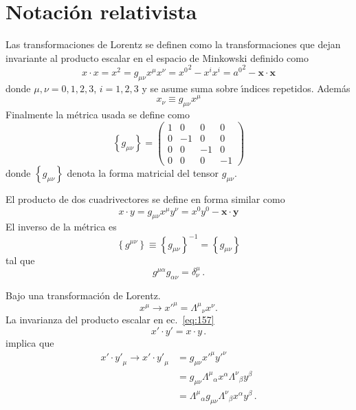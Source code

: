 \section{Notaci\'on relativista}
\label{sec:srn}
\begin{frame}
Las transformaciones de Lorentz se definen como la transformaciones que dejan invariante al producto escalar en el espacio de Minkowski definido como
\begin{equation}
  \label{eq:146}
 x\cdot x= x^2=g_{\mu\nu}x^\mu x^\nu={x^0}^2-x^i x^i={a^0}^2-\mathbf{x}\cdot\mathbf{x}
\end{equation}
donde $\mu,\nu=0,1,2,3$, $i=1,2,3$ y se asume suma sobre \'\i ndices repetidos. Adem\'as
\begin{equation}
\label{eq:149}
  x_\nu\equiv g_{\mu\nu}x^\mu
\end{equation}
 Finalmente la m\'etrica usada se define como
\begin{equation}
  \label{eq:gmunu}
  \left\{ g_{\mu\nu} \right\}=
  \begin{pmatrix}
    1&0&0&0\\
    0&-1&0&0\\
    0&0&-1&0\\
    0&0&0&-1
  \end{pmatrix}
\end{equation}
donde $\left\{ g_{\mu\nu} \right\}$ denota la forma matricial del tensor $g_{\mu\nu}$.  



El producto de dos cuadrivectores se define en forma similar como
\begin{equation}
\label{eq:157}
  x\cdot y=g_{\mu\nu}x^\mu y^\nu=x^0y^0-\mathbf{x}\cdot\mathbf{y}
\end{equation}
El inverso de la métrica es
\begin{equation}
  \left\{ g^{\mu\nu} \right\}\equiv\left\{ g_{\mu\nu} \right\}^{-1}=\left\{ g_{\mu\nu} \right\}
\end{equation}
tal que
\begin{equation}
  g^{\mu\alpha}g_{\alpha\nu}=\delta^\mu_\nu\,.
\end{equation}

Bajo una transformaci\'on de Lorentz.
\begin{equation}
  \label{eq:xx5}
  x^\mu\to {x'}^\mu={\Lambda^\mu}_{\nu}x^\nu.
\end{equation}
La invarianza del producto escalar en ec.~\eqref{eq:157}
\begin{equation}
  {x'}\cdot {y'}=x\cdot y\,.
\end{equation}
implica que
\begin{align}
\label{eq:Lambdasteps}
{x'}\cdot{y'}_\mu\to  {x'}\cdot{y'}_\mu&=g_{\mu\nu}{x'}^\mu{y'}^{\nu}\nonumber\\
  &=g_{\mu\nu}{\Lambda^{\mu}}_{\alpha}x^{\alpha}{\Lambda^{\nu}}_{\beta}y^{\beta}\nonumber\\
 &={\Lambda^{\mu}}_{\alpha}g_{\mu\nu}{\Lambda^{\nu}}_{\beta}x^{\alpha}y^{\beta}\,.
\end{align}


\end{frame}

